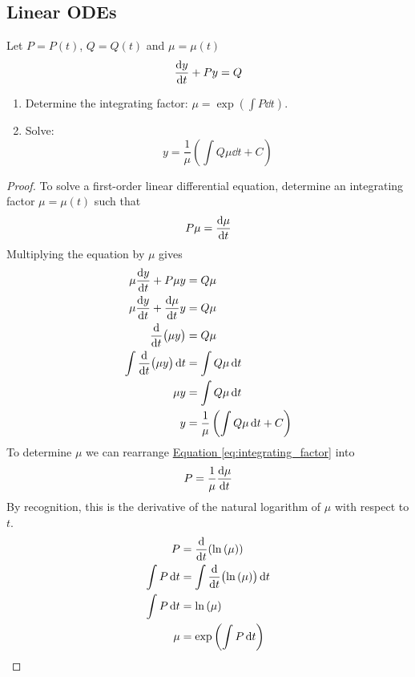 \documentclass{article}
\begin{document}
\subsection{Linear ODEs}
Let $P=P(t)$, $Q=Q(t)$ and $\mu = \mu(t)$
\begin{equation*}
    \dv{y}{t} + Py = Q
\end{equation*}
\begin{enumerate}
    \item Determine the integrating factor: $\displaystyle \mu=\exp{\left( \int P \dd{t} \right)}$.
    \item Solve:
    \begin{equation*}
        y=\frac{1}{\mu}\left(\int Q \mu \dd{t} + C\right)
    \end{equation*}
\end{enumerate}
\begin{proof}
    To solve a first-order linear differential equation, determine an integrating factor $\mu = \mu(t)$ such that
    \begin{equation}
        P \mu = \dv{\mu}{t} \label{eq:integrating_factor}
    \end{equation}
    Multiplying the equation by $\mu$ gives
    \begin{align*}
        \mu \dv{y}{t} + P \mu y &= Q \mu \\
        \mu \dv{y}{t} + \dv{\mu}{t} y &= Q \mu \\
        \dv{t}\bigl(\mu y\bigr) &= Q \mu \\
        \int \dv{t}\bigl(\mu y\bigr) \dd{t} &= \int Q \mu \dd{t} \\
        \mu y &= \int Q \mu \dd{t} \\
        y &= \frac{1}{\mu}\left(\int Q \mu \dd{t} + C\right)
    \end{align*}
    To determine $\mu$ we can rearrange \hyperref[eq:integrating_factor]{Equation \ref{eq:integrating_factor}} into
    \begin{align*}
        P = \frac{1}{\mu}\dv{\mu}{t}
    \end{align*}
    By recognition, this is the derivative of the natural logarithm of $\mu$ with respect to $t$.
    \begin{align*}
        P &= \dv{t}(\ln{\left( \mu \right)}) \\
        \int P \dd{t} &= \int \dv{t}\bigl(\ln{\left( \mu \right)}\bigr) \dd{t} \\
        \int P \dd{t} &= \ln{\left( \mu \right)} \\
        \mu &= \operatorname{exp}{\left( \int P \dd{t} \right)}
    \end{align*}
\end{proof}
\end{document}
